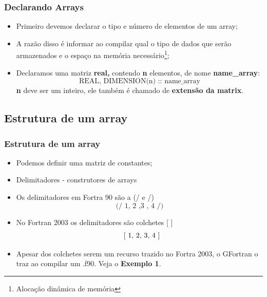 \documentclass[notes=show]{beamer}
\newenvironment{stepitemize}{\begin{itemize}[<+->]}{\end{itemize} }
\begin{document}
\begin{frame}%

\frametitle{Declarando Arrays}

\begin{stepitemize}
\item Primeiro devemos declarar o tipo e n\'{u}mero de elementos de um array;

\item A raz\~{a}o disso \'{e} informar ao compilar qual o tipo de dados que
ser\~{a}o armazenados e o espa\c{c}o na mem\'{o}ria necess\'{a}rio\footnote{Alocação dinâmica de memória};

\item Declaramos uma matriz \textbf{real,} contendo \textbf{n} elementos, de
nome \textbf{name\_array}:%
\[
\text{REAL, DIMENSION(n) :: name\_array} 
\]%
\textbf{n} deve ser um inteiro, ele tamb\'{e}m \'{e} chamado de \textbf{%
extens\~{a}o da matrix}.
\end{stepitemize}

\transboxout%
\end{frame}%

\subsection{Estrutura de um array}

\begin{frame}%

\frametitle{Estrutura de um array}

\begin{itemize}
\item Podemos definir uma matriz de constantes;

\item Delimitadores - construtores de arrays

\item Os delimitadores em Fortra 90 s\~{a}o a (/ e /)%
\[
\text{(/ 1, 2 ,3 , 4 /)} 
\]

\item No Fortran 2003 os delimitadores s\~{a}o colchetes [ ]%
\[
\text{\lbrack\ 1, 2, 3, 4 ]} 
\]

\item Apesar dos colchetes serem um recurso trazido no Fortra 2003, o
GFortran o traz ao compilar um .f90. Veja o \textbf{Exemplo 1}.
\end{itemize}

\transboxout%
\end{frame}%
\end{document}
